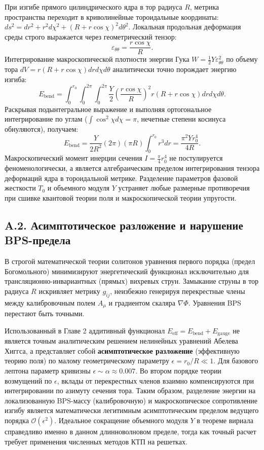 \documentclass[11pt,a4paper]{article}
\begin{document}
	При изгибе прямого цилиндрического ядра в тор радиуса $R$, метрика пространства переходит в криволинейные тороидальные координаты: $ds^2 = dr^2 + r^2 d\chi^2 + (R + r\cos\chi)^2 d\theta^2$.
	Локальная продольная деформация среды строго выражается через геометрический тензор:
	\begin{equation}
		\varepsilon_{\theta\theta} = \frac{r \cos\chi}{R}.
	\end{equation}
	Интегрирование макроскопической плотности энергии Гука $W = \frac{1}{2} Y \varepsilon_{\theta\theta}^2$ по объему тора $dV = r(R + r\cos\chi) dr d\chi d\theta$ аналитически точно порождает энергию изгиба:
	\begin{equation}
		E_{\text{bend}} = \int_0^{r_0} \int_0^{2\pi} \int_0^{2\pi} \frac{Y}{2} \left( \frac{r \cos\chi}{R} \right)^2 r(R + r\cos\chi) dr d\chi d\theta.
	\end{equation}
	Раскрывая подынтегральное выражение и выполняя ортогональное интегрирование по углам ($\int \cos^2\chi d\chi = \pi$, нечетные степени косинуса обнуляются), получаем:
	\begin{equation}
		E_{\text{bend}} = \frac{Y}{2 R^2} (2\pi) (\pi R) \int_0^{r_0} r^3 dr = \frac{\pi^2 Y r_0^4}{4 R}.
	\end{equation}
	Макроскопический момент инерции сечения $I = \frac{\pi}{4} r_0^4$ не постулируется феноменологически, а является алгебраическим пределом интегрирования тензора деформаций ядра в тороидальной метрике. Разделение параметров фазовой жесткости $T_0$ и объемного модуля $Y$ устраняет любые размерные противоречия при сшивке квантовой теории поля и макроскопической теории упругости.

\subsection*{A.2. Асимптотическое разложение и нарушение BPS-предела}
В строгой математической теории солитонов уравнения первого порядка (предел Богомольного) минимизируют энергетический функционал исключительно для трансляционно-инвариантных (прямых) вихревых струн. Замыкание струны в тор радиуса $R$ искривляет метрику $g_{ij}$, неизбежно генерируя перекрестные члены между калибровочным полем $A_\mu$ и градиентом скаляра $\nabla \Phi$. Уравнения BPS перестают быть точными.

Использованный в Главе 2 аддитивный функционал $E_{\text{eff}} = E_{\text{bend}} + E_{\text{gauge}}$ не является точным аналитическим решением нелинейных уравнений Абелева Хиггса, а представляет собой \textbf{асимптотическое разложение} (эффективную теорию поля) по малому геометрическому параметру $\epsilon = r_0 / R \ll 1$.
Для базового лептона параметр кривизны $\epsilon \sim \alpha \approx 0.007$. Во втором порядке теории возмущений по $\epsilon$, вклады от перекрестных членов взаимно компенсируются при интегрировании по азимуту сечения тора. Таким образом, разделение энергии на локализованную BPS-массу (калибровочную) и макроскопическое сопротивление изгибу является математически легитимным асимптотическим пределом ведущего порядка $\mathcal{O}(\epsilon^2)$. Идеальное сокращение объемного модуля $Y$ в теореме вириала справедливо именно в данном длинноволновом пределе, тогда как точный расчет требует применения численных методов КТП на решетках.
	
\end{document}

